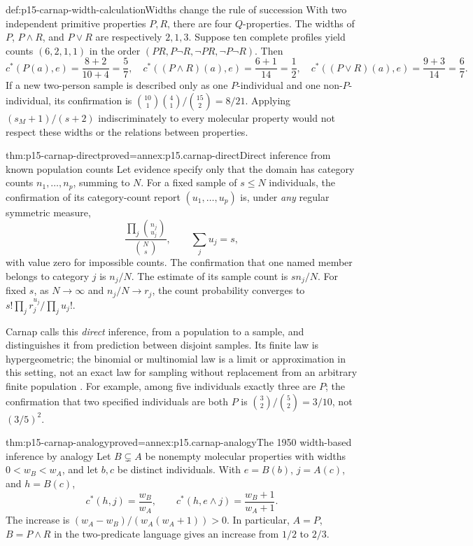 \begin{hbexample}{def:p15-carnap-width-calculation}{Widths change the rule of succession}
With two independent primitive properties \(P,R\), there are four
\(Q\)-properties. The widths of \(P\), \(P\land R\), and
\(P\lor R\) are respectively \(2,1,3\). Suppose ten complete
profiles yield counts \((6,2,1,1)\) in the order
\((PR,P\neg R,\neg PR,\neg P\neg R)\). Then
\[
 c^*(P(a),e)=\frac{8+2}{10+4}=\frac57,\quad
 c^*((P\land R)(a),e)=\frac{6+1}{14}=\frac12,\quad
 c^*((P\lor R)(a),e)=\frac{9+3}{14}=\frac67.
\]
If a new two-person sample is described only as one \(P\)-individual
and one non-\(P\)-individual, its confirmation is
\(\binom{10}{1}\binom4{1}/\binom{15}{2}=8/21\).
Applying \((s_M+1)/(s+2)\) indiscriminately to every molecular property
would not respect these widths or the relations between properties.
\end{hbexample}

\begin{hbtheorem}{thm:p15-carnap-direct}{proved=annex:p15.carnap-direct}{Direct inference from known population counts}
Let evidence specify only that the domain has category counts
\(n_1,\ldots,n_p\), summing to \(N\). For a fixed sample of
\(s\leq N\) individuals, the confirmation of its category-count
report \((u_1,\ldots,u_p)\) is, under \emph{any} regular symmetric
measure,
\[
 \frac{\prod_j\binom{n_j}{u_j}}{\binom Ns},\qquad
 \sum_j u_j=s,
\]
with value zero for impossible counts. The confirmation that one named
member belongs to category \(j\) is \(n_j/N\). The estimate of
its sample count is \(sn_j/N\). For fixed \(s\), as
\(N\to\infty\) and \(n_j/N\to r_j\), the count probability
converges to \(s!\prod_j r_j^{u_j}/\prod_j u_j!\).
\end{hbtheorem}

Carnap calls this \emph{direct} inference, from a population to a sample,
and distinguishes it from prediction between disjoint samples. Its
finite law is hypergeometric; the binomial or multinomial law is a
limit or approximation in this setting, not an exact law for sampling
without replacement from an arbitrary finite population
\cite[secs.~94--95, pp.~492--498]{Carnap1950Probability}.
For example, among five individuals exactly three are \(P\); the
confirmation that two specified individuals are both \(P\) is
\(\binom32/\binom52=3/10\), not \((3/5)^2\).

\begin{hbtheorem}{thm:p15-carnap-analogy}{proved=annex:p15.carnap-analogy}{The 1950 width-based inference by analogy}
Let \(B\subsetneq A\) be nonempty molecular properties with widths
\(0<w_B<w_A\), and let \(b,c\) be distinct individuals. With
\(e=B(b)\), \(j=A(c)\), and \(h=B(c)\),
\[
 c^*(h,j)=\frac{w_B}{w_A},\qquad
 c^*(h,e\land j)=\frac{w_B+1}{w_A+1}.
\]
The increase is \((w_A-w_B)/(w_A(w_A+1))>0\). In particular,
\(A=P\), \(B=P\land R\) in the two-predicate language gives
an increase from \(1/2\) to \(2/3\).
\end{hbtheorem}

